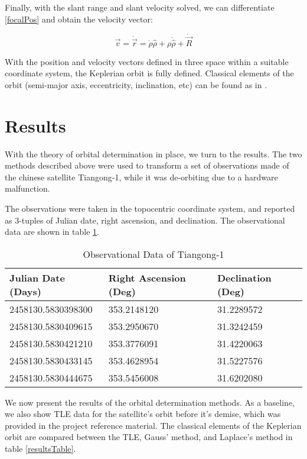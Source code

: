 \documentclass[11pt,twoside,letterpaper]{article}
\begin{document}
  Finally, with the slant range and slant velocity solved, we can
  differentiate \ref{focalPos} and obtain the velocity vector:

  \begin{equation}\label{focalVel}
    \vec{v} = \dot{\vec{r}} =
    \dot{\rho}\hat{\rho} + \rho\dot{\hat{\rho}} + \dot{\vec{R}}
  \end{equation}

  With the position and velocity vectors defined in three space within
  a suitable coordinate system, the Keplerian orbit is fully
  defined. Classical elements of the orbit (semi-major axis,
  eccentricity, inclination, etc) can be found as in \cite{kluever_2018}.

  \section{Results}
  With the theory of orbital determination in place, we turn to the
  results. The two methods described above were used to transform a
  set of observations made of the chinese satellite Tiangong-1, while
  it was de-orbiting due to a hardware malfunction.

  The observations were taken in the topocentric coordinate system,
  and reported as 3-tuples of Julian date, right ascension, and
  declination. The observational data are shown in table
  \ref{observations}.

  \begin{table}
    \centering
    \begin{tabular}{|l|l|l|}
      \hline
      Julian Date (Days)& Right Ascension (Deg)& Declination (Deg)\\ \hline
      2458130.5830398300 & 353.2148120 & 31.2289572 \\ \hline
      2458130.5830409615 & 353.2950670 & 31.3242459 \\ \hline
      2458130.5830421210 & 353.3776091 & 31.4220063 \\ \hline
      2458130.5830433145 & 353.4628954 & 31.5227576 \\ \hline
      2458130.5830444675 & 353.5456008 & 31.6202080 \\ \hline
    \end{tabular}
    \caption{Observational Data of Tiangong-1}
    \label{observations}
  \end{table}

  We now present the results of the orbital determination methods. As
  a baseline, we also show TLE data for the satellite's orbit before
  it's demise, which was provided in the project reference
  material. The classical elements of the Keplerian orbit are compared
  between the TLE, Gauss' method, and Laplace's method in table
  \ref{resultsTable}.
\end{document}

